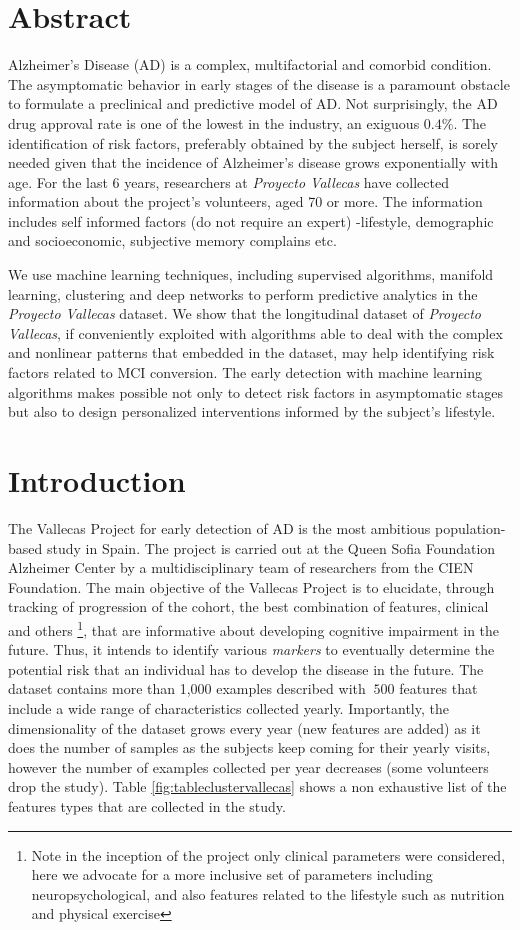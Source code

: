 \documentclass[11pt]{article}
\theoremstyle{definition}
\theoremstyle{remark}
\begin{document}
\section*{Abstract}
Alzheimer's Disease (AD) is a complex, multifactorial and comorbid condition. The asymptomatic behavior in early stages of the disease is a paramount obstacle to formulate a preclinical and predictive model of AD. Not surprisingly, the AD drug approval rate is one of the lowest in the industry, an exiguous $0.4\%$. The identification of risk factors, preferably obtained by the subject herself, is sorely needed given that the incidence of Alzheimer’s disease grows exponentially with age. 
For the last 6 years, researchers at \emph{Proyecto Vallecas} have collected information about the project's volunteers, aged 70 or more. The  information includes self informed factors (do not require an expert) -lifestyle, demographic and socioeconomic, subjective memory complains etc. 

We use machine learning techniques, including supervised algorithms, manifold learning, clustering and deep networks to perform predictive analytics in the \emph{Proyecto Vallecas} dataset.
We show that the longitudinal dataset of \emph{Proyecto Vallecas}, if conveniently exploited with algorithms able to deal with the complex and nonlinear patterns that embedded in the dataset, may help identifying risk factors related to MCI conversion.
The early detection with machine learning algorithms makes possible not only to detect risk factors in asymptomatic stages but also to design  personalized interventions informed by the subject's lifestyle.

\section{Introduction}

The Vallecas Project for early detection of AD is the most ambitious population-based study in Spain. The project is carried out at the Queen Sofia Foundation Alzheimer Center by a multidisciplinary team of researchers from the CIEN Foundation. The main objective of the Vallecas Project is to elucidate, through tracking of progression of the cohort, the best combination of features, clinical and others \footnote{Note in the inception of the project only clinical parameters were considered, here we advocate for a more inclusive set of parameters including neuropsychological, and also features related to the lifestyle such as nutrition and physical exercise}, that are informative about developing 
cognitive impairment in the future. Thus, it intends to identify various \emph{markers} to eventually determine the potential risk that an  individual has to develop the disease in the future. The dataset contains more than 1,000 examples described with $~500$ features that include a wide range of characteristics collected yearly. Importantly, the dimensionality of the dataset grows every year (new features are added) as it does the number of samples as the subjects keep coming for their yearly visits, however the number of examples collected per year decreases (some volunteers drop the study). Table \ref{fig:tableclustervallecas} shows a non exhaustive list of the features types that are collected in the study.
\end{document}
